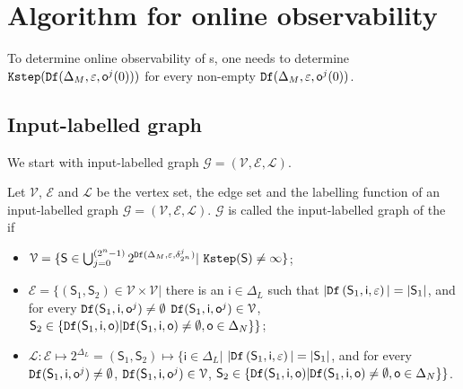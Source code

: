 
\section{Algorithm for online observability}
\label{sec:deter}
To  determine  online observability of \BCN s, one needs to determine ${\tt Kstep}({\tt Df}(\Delta_M,\varepsilon,\mathsf{o}^{j}(0)))$ for every non-empty ${\tt Df}(\Delta_M,\varepsilon, \mathsf{o}^{j}(0))$. 

\subsection{Input-labelled graph}
We start with input-labelled graph $\mathcal{G}=(\mathcal{V}, \mathcal{E}, \mathcal{L})$.

\begin{definition}
Let $\mathcal{V}$, $\mathcal{E}$ and $\mathcal{L}$ be the vertex set, the edge set and the labelling function of an input-labelled graph $\mathcal{G}=(\mathcal{V}, \mathcal{E}, \mathcal{L})$. $\mathcal{G}$ is called the input-labelled graph of the \BCN\, if 
\begin{itemize}
\item  $\mathcal{V}=\{\mathsf{S}\in\bigcup_{j=0}^{(2^{n} -1)} 2^{\Ded(\Delta_M,\varepsilon,\delta^j_{2^{n}} )}|\ \Ks(\mathsf{S})\ne \infty\}$;
\item  $\mathcal{E}=\{(\mathsf{S}_1,\mathsf{S}_2)\in \mathcal{V}\times \mathcal{V}|$ there is an $\mathsf{i} \in \Delta_L$ such that $|{\tt Df}\left(\mathsf{S}_1,\mathsf{i},\varepsilon\right)|=|\mathsf{S}_1|$, and for every ${\tt Df}(\mathsf{S}_1,\mathsf{i},\mathsf{o}^{j})\neq \emptyset$ ${\tt Df}(\mathsf{S}_1,\mathsf{i},\mathsf{o}^{j})\in \mathcal{V}$, $\mathsf{S}_2\in\{{\tt Df}(\mathsf{S}_1,\mathsf{i},\mathsf{o})| {\tt Df}(\mathsf{S}_1,\mathsf{i},\mathsf{o})\neq \emptyset, \mathsf{o}\in \Delta_N\}\}$;
\item  $\mathcal{L}:\mathcal{E}\mapsto 2^{\Delta_L}=(\mathsf{S}_1,\mathsf{S}_2)\mapsto\{\mathsf{i}\in \Delta_L|$ $|{\tt Df}\left(\mathsf{S}_1,\mathsf{i},\varepsilon\right)|=|\mathsf{S}_1|$, and for every ${\tt Df}(\mathsf{S}_1,\mathsf{i},\mathsf{o}^{j})\neq \emptyset$, ${\tt Df}(\mathsf{S}_1,\mathsf{i},\mathsf{o}^{j})\in \mathcal{V}$, $\mathsf{S}_2\in\{{\tt Df}(\mathsf{S}_1,\mathsf{i},\mathsf{o})| {\tt Df}(\mathsf{S}_1,\mathsf{i},\mathsf{o})\neq \emptyset, \mathsf{o}\in \Delta_N\}\}$.
 \end{itemize}
\end{definition}

